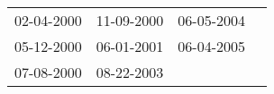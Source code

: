 \begin{supertabular}{llll}
 02-04-2000 &  11-09-2000 &  06-05-2004 \\
 05-12-2000 &  06-01-2001 &  06-04-2005 \\
 07-08-2000 &  08-22-2003 &             \\
\end{supertabular}
